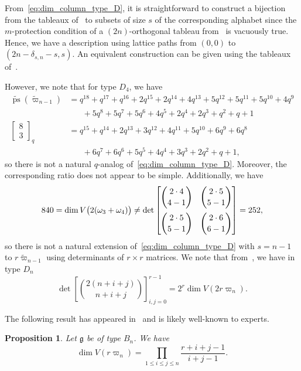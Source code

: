 \documentclass[11pt, leqno]{amsart}
\theoremstyle{plain}
\newtheorem{proposition}[theorem]{Proposition}
\theoremstyle{definition}
\numberwithin{equation}{section}
\newcommand{\g}{\mathfrak{g}}
\newcommand{\fw}{\varpi} %
\newcommand{\tfw}{\widetilde{\fw}} %
\newcommand{\qbinom}[3]{\left[ \begin{matrix} #1 \\ #2 \end{matrix} \right]_{#3}} %
\newcommand{\ps}{\operatorname{ps}} %
\newcommand{\nps}{\widetilde{\ps}} %
\begin{document}
From~\eqref{eq:dim_column_type_D}, it is straightforward to construct a bijection from the tableaux of~\cite[Thm.~6.1]{Proctor94} to subsets of size $s$ of the corresponding alphabet since the $m$-protection condition of a $(2n)$-orthogonal tableau from~\cite{Proctor94} is vacuously true. Hence, we have a description using lattice paths from $(0,0)$ to $(2n-\delta_{s,n}-s, s)$.
An equivalent construction can be given using the tableaux of~\cite[Def.~3.5]{KW93}.

However, we note that for type $D_4$, we have
\begin{align*}
\nps(\tfw_{n-1}) & = q^{18} + q^{17} + q^{16} + 2q^{15} + 2q^{14} + 4q^{13} + 5q^{12} + 5q^{11} + 5q^{10} + 4q^{9}
\\ & \hspace{20pt} + 5q^{8} + 5q^{7} + 5q^{6} + 4q^{5} + 2q^{4} + 2q^{3} + q^{2} + q + 1
\\ \qbinom{8}{3}{q} & = q^{15} + q^{14} + 2q^{13} + 3q^{12} + 4q^{11} + 5q^{10} + 6q^{9} + 6q^{8}
\\ & \hspace{20pt} + 6q^{7} + 6q^{6} + 5q^{5} + 4q^{4} + 3q^{3} + 2q^{2} + q + 1,
\end{align*}
so there is not a natural $q$-analog of~\eqref{eq:dim_column_type_D}. Moreover, the corresponding ratio does not appear to be simple.
Additionally, we have
\[
840 = \dim V\bigl(2(\omega_3 + \omega_4)\bigr) \neq \det \begin{bmatrix}
\displaystyle \binom{2\cdot4}{4-1} & \displaystyle \binom{2\cdot5}{5-1} \vspace{5pt} \\
\displaystyle \binom{2\cdot5}{5-1} & \displaystyle \binom{2\cdot6}{6-1} \end{bmatrix}
= 252,
\]
so there is not a natural extension of~\eqref{eq:dim_column_type_D} with $s = n-1$ to $r\tfw_{n-1}$ using determinants of $r \times r$ matrices.
We note that from~\cite[Thm.~2.1]{Okada09}, we have in type $D_n$
\[
\det \left[ \binom{2(n+i+j)}{n+i+j} \right]_{i,j=0}^{r-1} = 2^r \dim V(2r\fw_n).
\]

The following result has appeared in~\cite[Thm.~2.1]{Okada09} and is likely well-known to experts.

\begin{proposition}
\label{prop:all_spin_rectangles}
Let $\g$ be of type $B_n$. We have
\[
\dim V(r\fw_n) = \prod_{1\leq i \leq j \leq n} \dfrac{r+i+j-1}{i+j-1}.
\]
\end{proposition}
\end{document}
